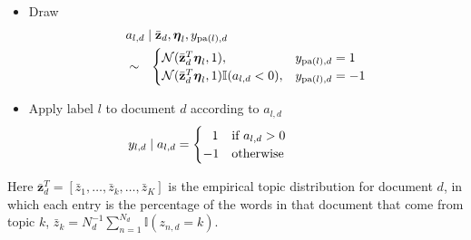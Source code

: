 \begin{shortbox}
\begin{enumerate}
\begin{itemize}
\begin{itemize}
\item Draw 
\begin{eqnarray}\lefteqn{a_{l,d}\mid \bar{\mathbf{z}}_d,\boldsymbol\eta_{l},y_{\mathrm{pa}(l),d}}\nonumber \\&\sim&\begin{cases}
\mathcal{N}(\bar{\mathbf{z}}^{T}_d\boldsymbol\eta_{l},1), & y_{\mathrm{pa}(l),d}=1 \\
\mathcal{N}(\bar{\mathbf{z}}^{T}_d\boldsymbol\eta_{l},1)\mathbb{I}(a_{l,d}<0), & y_{\mathrm{pa}(l),d}=-1 \end{cases}\label{zero_0}\end{eqnarray} %
 
\item Apply label $l$ to document $d$ according to $a_{l,d}$ \begin{eqnarray}\hspace{-2.2cm}
y_{l,d}\mid a_{l,d}=\begin{cases}
\;\;\, 1 & \text{if \ensuremath{a_{l,d}>0}}  \\%
 -1 & \text{otherwise} \end{cases}\label{zero_1}\end{eqnarray}
 
\end{itemize}
\end{itemize}
\end{enumerate}
\label{box:generative_model}
\end{shortbox}

Here $\bar{\mathbf{z}}_d^T = [\bar{z}_{1}, \ldots, \bar{z}_k, \ldots, \bar{z}_K]$ is the empirical topic distribution for document $d$, in which each entry is the percentage of the words in that document that come from topic $k$, $\bar{z}_{k}=N_{d}^{-1}\sum_{n=1}^{N_d}\mathbb{I}(z_{n,d}=k).$  

